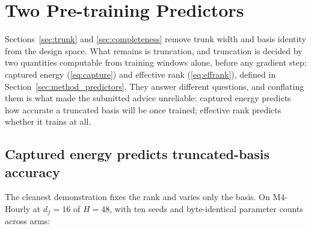 %

\section{Two Pre-training Predictors}
\label{sec:predictors}

Sections~\ref{sec:trunk} and \ref{sec:completeness} remove trunk width and
basis identity from the design space. What remains is truncation, and
truncation is decided by two quantities computable from training windows
alone, before any gradient step: captured energy
(\ref{eq:capture}) and effective rank (\ref{eq:effrank}), defined in
Section~\ref{sec:method_predictors}. They answer different questions, and
conflating them is what made the submitted advice unreliable: captured
energy predicts how accurate a truncated basis will be once trained;
effective rank predicts whether it trains at all.

\subsection{Captured energy predicts truncated-basis accuracy}
\label{sec:predictors:capture}

The cleanest demonstration fixes the rank and varies only the basis. On
M4-Hourly at $d_f = 16$ of $H = 48$, with ten seeds and byte-identical
parameter counts across arms:

